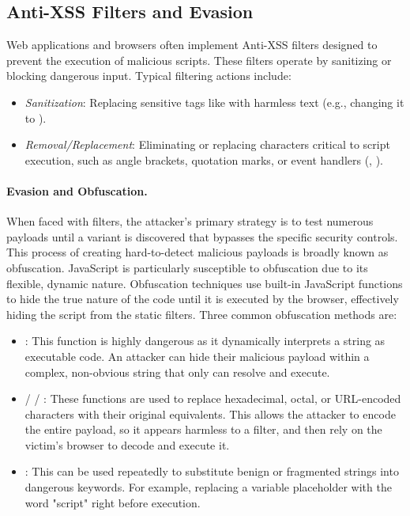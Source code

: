 \subsection{Anti-XSS Filters and Evasion}
Web applications and browsers often implement Anti-XSS filters designed to prevent the execution of malicious scripts. These filters operate by sanitizing or blocking dangerous input. Typical filtering actions include:

\begin{itemize}
    \item \textit{Sanitization}: Replacing sensitive tags like  with harmless text (e.g., changing it to ).
    \item \textit{Removal/Replacement}: Eliminating or replacing characters critical to script execution, such as angle brackets, quotation marks, or event handlers (, ).
\end{itemize}

\paragraph{Evasion and Obfuscation.} When faced with filters, the attacker's primary strategy is to test numerous payloads until a variant is discovered that bypasses the specific security controls. This process of creating hard-to-detect malicious payloads is broadly known as obfuscation. JavaScript is particularly susceptible to obfuscation due to its flexible, dynamic nature. Obfuscation techniques use built-in JavaScript functions to hide the true nature of the code until it is executed by the browser, effectively hiding the script from the static filters. Three common obfuscation methods are:

\begin{itemize}
    \item {}: This function is highly dangerous as it dynamically interprets a string as executable code. An attacker can hide their malicious payload within a complex, non-obvious string that only  can resolve and execute.
    \item {} /  / : These functions are used to replace hexadecimal, octal, or URL-encoded characters with their original equivalents. This allows the attacker to encode the entire payload, so it appears harmless to a filter, and then rely on the victim's browser to decode and execute it.
    \item {}: This can be used repeatedly to substitute benign or fragmented strings into dangerous keywords. For example, replacing a variable placeholder with the word "script" right before execution.
\end{itemize}

